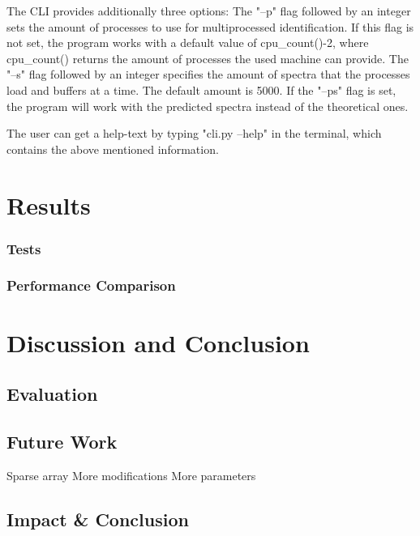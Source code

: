 \documentclass[11pt]{article}
\begin{document}
The CLI provides additionally three options: The "--p" flag followed by an integer sets the amount of processes to use for multiprocessed identification. If this flag is not set, the program works with a default value of cpu\_count()-2, where cpu\_count() returns the amount of processes the used machine can provide. The "--s" flag followed by an integer specifies the amount of spectra that the processes load and buffers at a time. The default amount is 5000. If the "--ps" flag is set, the program will work with the predicted spectra instead of the theoretical ones.

The user can get a help-text by typing "cli.py --help" in the terminal, which contains the above mentioned information.


\section{Results}
\subsubsection{Tests}
\subsubsection{Performance Comparison}
\section{Discussion and Conclusion}
\subsection{Evaluation}
\subsection{Future Work}
Sparse array
More modifications
More parameters
\subsection{Impact \& Conclusion}


\printbibliography
\end{document}
